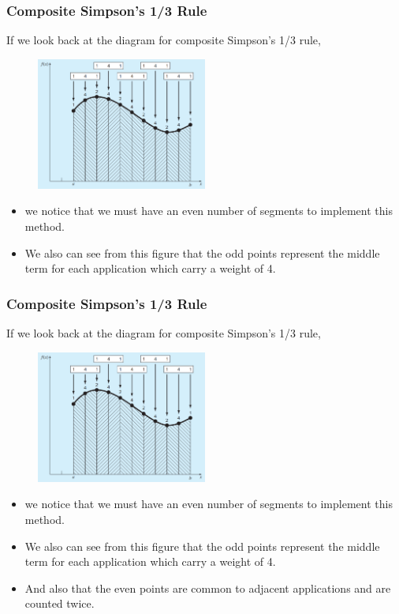 \documentclass{if-beamer}
\begin{document}
\begin{frame}[t]
	\frametitle{Composite Simpson's 1/3 Rule}
	If we look back at the diagram for composite Simpson's 1/3 rule, 
	\begin{figure}
		\centering
		\includegraphics[width = 0.5\textwidth]{figures/compsimp}
	\end{figure}
	\begin{itemize}
		\item we notice that we must have an even number of segments to implement this method.\\
		\item We also can see from this figure that the odd points represent the middle term for each application which carry a weight of 4. \\
	\end{itemize} 
\end{frame}

\begin{frame}[t]
	\frametitle{Composite Simpson's 1/3 Rule}
	If we look back at the diagram for composite Simpson's 1/3 rule, 
	\begin{figure}
		\centering
		\includegraphics[width = 0.5\textwidth]{figures/compsimp}
	\end{figure}
	\begin{itemize}
		\item we notice that we must have an even number of segments to implement this method.\\
		\item We also can see from this figure that the odd points represent the middle term for each application which carry a weight of 4. \\
		\item And also that the even points are common to adjacent applications and are counted twice.
	\end{itemize} 
\end{frame}
\end{document}
